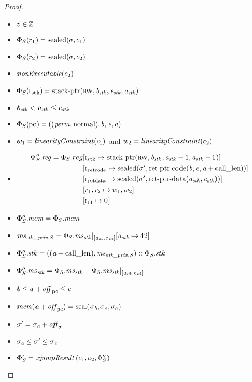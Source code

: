 \begin{proof}
\begin{enumproof}
\begin{itemize}
    \item $z \in \mathbb{Z}$
    \item $\Phi_S(r_1) = \mathrm{sealed}(\sigma,c_1)$
    \item $\Phi_S(r_2) = \mathrm{sealed}(\sigma,c_2)$
    \item $\nonExec{c_2}$
    \item $\Phi_S(\mathrm{r}_\mathrm{stk}) = \mathrm{stack\text{-}ptr}(\textsc{rw}, \mathit{b}_{\mathit{stk}}, \mathit{e}_{\mathit{stk}}, \mathit{a}_{\mathit{stk}})$
    \item $\mathit{b}_{\mathit{stk}} < \mathit{a}_{\mathit{stk}} \leq \mathit{e}_{\mathit{stk}}$
    \item $\Phi_S(\mathrm{pc}) = ((\mathit{perm},\mathrm{normal}),\mathit{b},\mathit{e},\mathit{a})$
    \item $w_1 = \linCons{c_1}$ and $w_2 = \linCons{c_2}$
    \item \[
        \begin{split}
          \Phi_S''.\reg = \Phi_S.reg      &[\rstk \mapsto \stkptr{\rw,\baddr_\stk,\aaddr_\stk-1,\aaddr_\stk-1}] \\
          &[\rretc \mapsto \sealed{\sigma',\retptrc(\baddr,\eaddr,\aaddr+\calllen)}]\\
          &[\rretd \mapsto \sealed{\sigma',\retptrd(\aaddr_\stk,\eaddr_\stk)}] \\
          &[r_1,r_2 \mapsto w_1,w_2] \\
          &[\rtmp{1} \mapsto 0]
        \end{split}
      \]
    \item $\Phi_S''.\mathit{mem} = \Phi_S.\mathit{mem}$
    \item $\mathit{ms}_{\mathit{stk}\_\mathit{priv},S} = \Phi_S.\mathit{ms}_{\mathit{stk}} |_{[\mathit{a}_{\mathit{stk}},\mathit{e}_{\mathit{stk}}]}[\mathit{a}_{\mathit{stk}} \mapsto 42]$
    \item $\Phi_S''.\mathit{stk} = ((\mathit{a}+\mathrm{call\_len}),\mathit{ms}_{\mathit{stk}\_\mathit{priv},S}) :: \Phi_S.\mathit{stk}$
    \item $\Phi_S''.\mathit{ms}_{\mathit{stk}} = \Phi_S.\mathit{ms}_{\mathit{stk}} -
      \Phi_S.\mathit{ms}_{\mathit{stk}}|_{[\mathit{a}_{\mathit{stk}},\mathit{e}_{\mathit{stk}}]}$
    \item $\mathit{b} \leq \mathit{a}+\mathit{off}_{\mathrm{pc}} \leq \mathit{e}$
    \item $\mathit{mem}(\mathit{a}+\mathit{off}_{\mathrm{pc}}) = \mathrm{seal}(\sigma_{\mathit{b}},\sigma_{\mathit{e}},\sigma_{\mathit{a}})$
    \item $\sigma' = \sigma_{\mathit{a}} + \mathit{off}_\sigma$
    \item $\sigma_{\mathit{a}} \leq \sigma' \leq \sigma_{\mathit{e}}$

    \item $\Phi_S' =\mathit{xjumpResult}\left(c_1,c_2, \Phi_S'' \right)$


\end{itemize}
\end{enumproof}
\end{proof}
